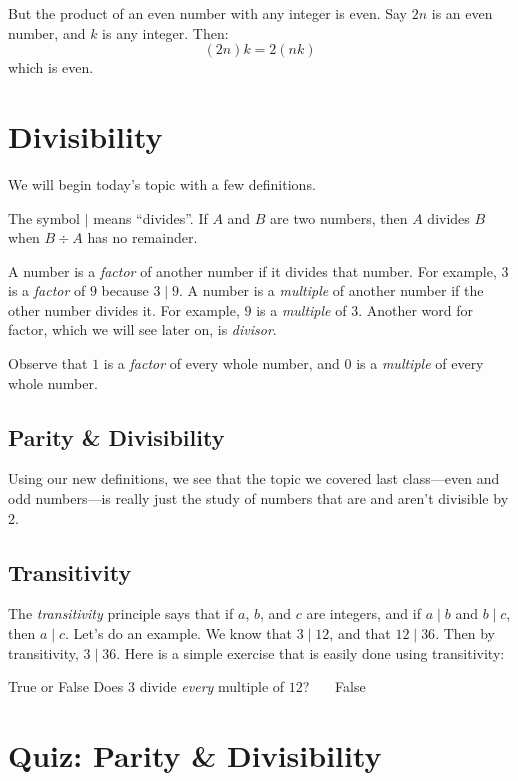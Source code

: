 \documentclass[a4paper,10pt]{report}
\begin{document}
But the product of an even number with any integer is even. Say $2n$ is an
even number, and $k$ is any integer. Then: \[
 (2n)k = 2(nk)
\] which is even.

\chapter{Divisibility}

We will begin today's topic with a few definitions.

The symbol $\mid$ means ``divides''. If $A$ and $B$ are two numbers, then $A$
divides $B$ when $B \div A$ has no remainder.

A number is a \emph{factor} of another number if it divides that number. For
example, $3$ is a \emph{factor} of $9$ because $3 \mid 9$. A number is a
\emph{multiple} of another number if the other number divides it. For example,
$9$ is a \emph{multiple} of $3$. Another word for factor, which we will see
later on, is \emph{divisor}.

Observe that $1$ is a \emph{factor} of every whole number, and $0$ is a
\emph{multiple} of every whole number.

\section{Parity \& Divisibility}

Using our new definitions, we see that the topic we covered last class---even
and odd numbers---is really just the study of numbers that are and aren't
divisible by $2$.

\section{Transitivity}

The \emph{transitivity} principle says that if $a$, $b$, and $c$ are integers,
and if $a \mid b$ and $b \mid c$, then $a \mid c$. Let's do an example. We know
that $3 \mid 12$, and that $12 \mid 36$. Then by transitivity, $3 \mid 36$. Here
is a simple exercise that is easily done using transitivity:

\begin{problem}{True or False}
 Does $3$ divide \emph{every} multiple of $12$? \hfill {}~~~False
\end{problem}

\chapter{Quiz: Parity \& Divisibility}
\end{document}
